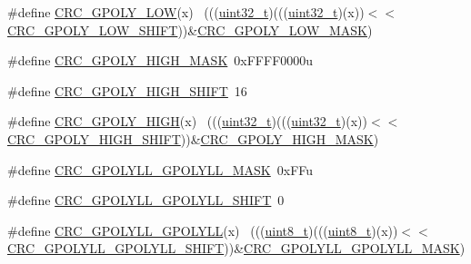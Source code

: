 \begin{DoxyCompactItemize}
\item 
\#define \hyperlink{group___c_r_c___register___masks_ga8ca8f0515fe1c754a85c9675a72724a2}{C\+R\+C\+\_\+\+G\+P\+O\+L\+Y\+\_\+\+L\+OW}(x)                                              ~(((\hyperlink{_p_e___types_8h_a33594304e786b158f3fb30289278f5af}{uint32\+\_\+t})(((\hyperlink{_p_e___types_8h_a33594304e786b158f3fb30289278f5af}{uint32\+\_\+t})(x))$<$$<$\hyperlink{group___c_r_c___register___masks_ga3830f95399bd5190027aaf00f307d10b}{C\+R\+C\+\_\+\+G\+P\+O\+L\+Y\+\_\+\+L\+O\+W\+\_\+\+S\+H\+I\+FT}))\&\hyperlink{group___c_r_c___register___masks_ga861d4f6f458051a63a7b01e6e5d8794b}{C\+R\+C\+\_\+\+G\+P\+O\+L\+Y\+\_\+\+L\+O\+W\+\_\+\+M\+A\+SK})
\item 
\#define \hyperlink{group___c_r_c___register___masks_ga96c07e55f3d3c43d7b3e7637bc854ed6}{C\+R\+C\+\_\+\+G\+P\+O\+L\+Y\+\_\+\+H\+I\+G\+H\+\_\+\+M\+A\+SK}~0x\+F\+F\+F\+F0000u
\item 
\#define \hyperlink{group___c_r_c___register___masks_ga991debc471e54dcf5297d6a42c5778e6}{C\+R\+C\+\_\+\+G\+P\+O\+L\+Y\+\_\+\+H\+I\+G\+H\+\_\+\+S\+H\+I\+FT}~16
\item 
\#define \hyperlink{group___c_r_c___register___masks_ga90a11ee1325340cc0d7e18d791814a36}{C\+R\+C\+\_\+\+G\+P\+O\+L\+Y\+\_\+\+H\+I\+GH}(x)                                            ~(((\hyperlink{_p_e___types_8h_a33594304e786b158f3fb30289278f5af}{uint32\+\_\+t})(((\hyperlink{_p_e___types_8h_a33594304e786b158f3fb30289278f5af}{uint32\+\_\+t})(x))$<$$<$\hyperlink{group___c_r_c___register___masks_ga991debc471e54dcf5297d6a42c5778e6}{C\+R\+C\+\_\+\+G\+P\+O\+L\+Y\+\_\+\+H\+I\+G\+H\+\_\+\+S\+H\+I\+FT}))\&\hyperlink{group___c_r_c___register___masks_ga96c07e55f3d3c43d7b3e7637bc854ed6}{C\+R\+C\+\_\+\+G\+P\+O\+L\+Y\+\_\+\+H\+I\+G\+H\+\_\+\+M\+A\+SK})
\item 
\#define \hyperlink{group___c_r_c___register___masks_ga659c987f1e9d74e32d16e4b69bd763ee}{C\+R\+C\+\_\+\+G\+P\+O\+L\+Y\+L\+L\+\_\+\+G\+P\+O\+L\+Y\+L\+L\+\_\+\+M\+A\+SK}~0x\+F\+Fu
\item 
\#define \hyperlink{group___c_r_c___register___masks_ga1a323693acd9a37bb90abdc7f16ebbd8}{C\+R\+C\+\_\+\+G\+P\+O\+L\+Y\+L\+L\+\_\+\+G\+P\+O\+L\+Y\+L\+L\+\_\+\+S\+H\+I\+FT}~0
\item 
\#define \hyperlink{group___c_r_c___register___masks_ga2ee0f77533aefa75692a541b5eac2a1b}{C\+R\+C\+\_\+\+G\+P\+O\+L\+Y\+L\+L\+\_\+\+G\+P\+O\+L\+Y\+LL}(x)                                  ~(((\hyperlink{_p_e___types_8h_aba7bc1797add20fe3efdf37ced1182c5}{uint8\+\_\+t})(((\hyperlink{_p_e___types_8h_aba7bc1797add20fe3efdf37ced1182c5}{uint8\+\_\+t})(x))$<$$<$\hyperlink{group___c_r_c___register___masks_ga1a323693acd9a37bb90abdc7f16ebbd8}{C\+R\+C\+\_\+\+G\+P\+O\+L\+Y\+L\+L\+\_\+\+G\+P\+O\+L\+Y\+L\+L\+\_\+\+S\+H\+I\+FT}))\&\hyperlink{group___c_r_c___register___masks_ga659c987f1e9d74e32d16e4b69bd763ee}{C\+R\+C\+\_\+\+G\+P\+O\+L\+Y\+L\+L\+\_\+\+G\+P\+O\+L\+Y\+L\+L\+\_\+\+M\+A\+SK})
$$
\end{DoxyCompactItemize}
